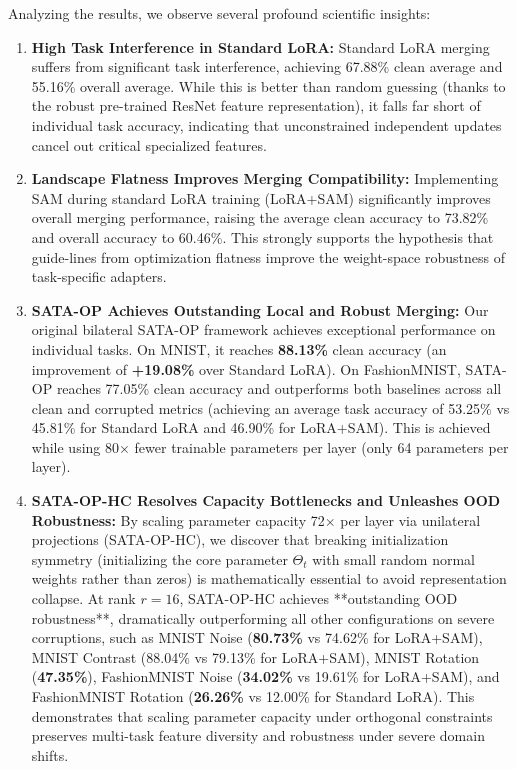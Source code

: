 \documentclass{article}
\theoremstyle{plain}
\theoremstyle{definition}
\theoremstyle{remark}
\begin{document}
Analyzing the results, we observe several profound scientific insights:
\begin{enumerate}
    \item \textbf{High Task Interference in Standard LoRA:} Standard LoRA merging suffers from significant task interference, achieving 67.88\% clean average and 55.16\% overall average. While this is better than random guessing (thanks to the robust pre-trained ResNet feature representation), it falls far short of individual task accuracy, indicating that unconstrained independent updates cancel out critical specialized features.
    \item \textbf{Landscape Flatness Improves Merging Compatibility:} Implementing SAM during standard LoRA training (LoRA+SAM) significantly improves overall merging performance, raising the average clean accuracy to 73.82\% and overall accuracy to 60.46\%. This strongly supports the hypothesis that guide-lines from optimization flatness improve the weight-space robustness of task-specific adapters.
    \item \textbf{SATA-OP Achieves Outstanding Local and Robust Merging:} Our original bilateral SATA-OP framework achieves exceptional performance on individual tasks. On MNIST, it reaches \textbf{88.13\%} clean accuracy (an improvement of \textbf{+19.08\%} over Standard LoRA). On FashionMNIST, SATA-OP reaches 77.05\% clean accuracy and outperforms both baselines across all clean and corrupted metrics (achieving an average task accuracy of 53.25\% vs 45.81\% for Standard LoRA and 46.90\% for LoRA+SAM). This is achieved while using 80$\times$ fewer trainable parameters per layer (only 64 parameters per layer).
    \item \textbf{SATA-OP-HC Resolves Capacity Bottlenecks and Unleashes OOD Robustness:} By scaling parameter capacity 72$\times$ per layer via unilateral projections (SATA-OP-HC), we discover that breaking initialization symmetry (initializing the core parameter $\Theta_t$ with small random normal weights rather than zeros) is mathematically essential to avoid representation collapse. At rank $r=16$, SATA-OP-HC achieves **outstanding OOD robustness**, dramatically outperforming all other configurations on severe corruptions, such as MNIST Noise (\textbf{80.73\%} vs 74.62\% for LoRA+SAM), MNIST Contrast (88.04\% vs 79.13\% for LoRA+SAM), MNIST Rotation (\textbf{47.35\%}), FashionMNIST Noise (\textbf{34.02\%} vs 19.61\% for LoRA+SAM), and FashionMNIST Rotation (\textbf{26.26\%} vs 12.00\% for Standard LoRA). This demonstrates that scaling parameter capacity under orthogonal constraints preserves multi-task feature diversity and robustness under severe domain shifts.

\end{enumerate}
\end{document}
